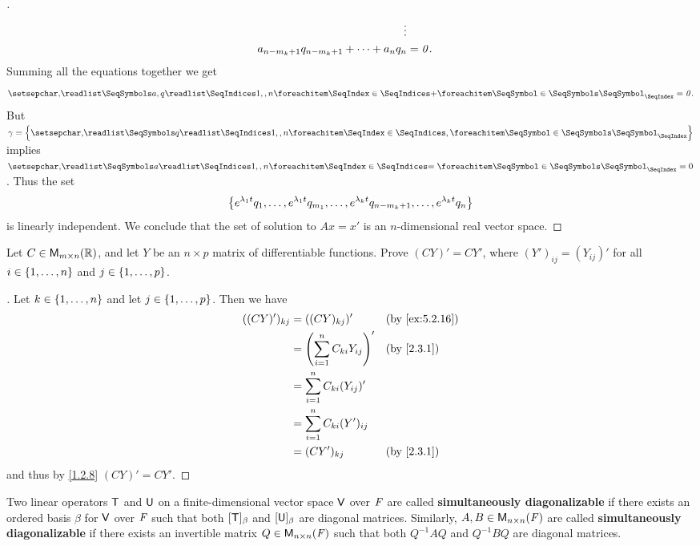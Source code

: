 \begin{proof}[]
\begin{align*}
		\vdots                                                      \\
		a_{n - m_k + 1} q_{n - m_k + 1} + \cdots + a_n q_n & = \mathit{0}.
	\end{align*}
	Summing all the equations together we get
	\[
		\seq[+]{a,q}{1,,n} = \zv.
	\]
	But \(\gamma = \set{\seq{q}{1,,n}}\) implies \(\seq[=]{a}{1,,n} = 0\).
	Thus the set
	\[
		\left\lbrace e^{\lambda_1 t} q_1, \dots, e^{\lambda_1 t} q_{m_1}, \dots, e^{\lambda_k t} q_{n - m_k + 1}, \dots, e^{\lambda_k t} q_n\right\rbrace
	\]
	is linearly independent.
	We conclude that the set of solution to \(Ax = x'\) is an \(n\)-dimensional real vector space.
\end{proof}

\begin{ex}\label{ex:5.2.16}
	Let \(C \in \mathsf{M}_{{m} \times n}({\mathbb{R}})\), and let \(Y\) be an \(n \times p\) matrix of differentiable functions.
	Prove \((CY)' = C Y'\), where \((Y')_{i j} = (Y_{i j})'\) for all \(i \in \left\lbrace1, \dots, n\right\rbrace\) and \(j \in \left\lbrace1, \dots, p\right\rbrace\).
\end{ex}

\begin{proof}[]
	Let \(k \in \left\lbrace1, \dots, n\right\rbrace\) and let \(j \in \left\lbrace1, \dots, p\right\rbrace\).
	Then we have
	\begin{align*}
		((CY)')_{k j} & = ((CY)_{k j})'                        &  & \by{ex:5.2.16} \\
		              & = \pa{\sum_{i = 1}^n C_{k i} Y_{i j}}' &  & \by{2.3.1}     \\
		              & = \sum_{i = 1}^n C_{k i} (Y_{i j})'                        \\
		              & = \sum_{i = 1}^n C_{k i} (Y')_{i j}                        \\
		              & = (C Y')_{k j}                         &  & \by{2.3.1}
	\end{align*}
	and thus by \cref{1.2.8} \((CY)' = C Y'\).
\end{proof}

\begin{defn}\label{5.2.8}
	Two linear operators \(\mathsf{T}\) and \(\mathsf{U}\) on a finite-dimensional vector space \(\mathsf{V}\) over \(\mathit{F}\) are called \textbf{simultaneously diagonalizable} if there exists an ordered basis \(\beta\) for \(\mathsf{V}\) over \(\mathit{F}\) such that both \([\mathsf{T}]_{\beta}\) and \([\mathsf{U}]_{\beta}\) are diagonal matrices.
	Similarly, \(A, B \in \mathsf{M}_{{n} \times n}({\mathit{F}})\) are called \textbf{simultaneously diagonalizable} if there exists an invertible matrix \(Q \in \mathsf{M}_{{n} \times n}({\mathit{F}})\) such that both \(Q^{-1} A Q\) and \(Q^{-1} B Q\) are diagonal matrices.
\end{defn}

